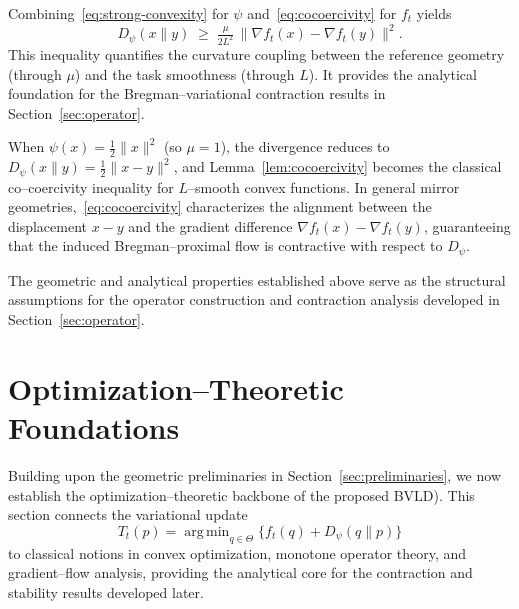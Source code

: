 \documentclass[11pt]{article}
\DeclareMathOperator*{\argmin}{arg\,min}
\theoremstyle{plain}
\theoremstyle{definition}
\theoremstyle{remark}
\begin{document}
Combining~\eqref{eq:strong-convexity} for $\psi$ and~\eqref{eq:cocoercivity} for $f_t$ yields
\begin{equation}
D_\psi(x\|y)
\;\ge\;
\tfrac{\mu}{2L^2}\,\|\nabla f_t(x)-\nabla f_t(y)\|^2.
\label{eq:compatibility}
\end{equation}
This inequality quantifies the curvature coupling between the reference geometry (through $\mu$)
and the task smoothness (through $L$).  It provides the analytical foundation for 
the Bregman–variational contraction results in Section~\ref{sec:operator}.


When $\psi(x)=\tfrac{1}{2}\|x\|^2$ (so $\mu=1$), the divergence reduces to 
$D_\psi(x\|y)=\tfrac{1}{2}\|x-y\|^2$, and Lemma~\ref{lem:cocoercivity} becomes 
the classical co–coercivity inequality for $L$–smooth convex functions.
In general mirror geometries,~\eqref{eq:cocoercivity} characterizes the 
alignment between the displacement $x-y$ and the gradient difference 
$\nabla f_t(x)-\nabla f_t(y)$, guaranteeing that the induced 
Bregman–proximal flow is contractive with respect to $D_\psi$.

\medskip
\noindent
The geometric and analytical properties established above serve as the 
structural assumptions for the operator construction and 
contraction analysis developed in Section~\ref{sec:operator}.






\section{Optimization–Theoretic Foundations}
\label{sec:optfoundations}

Building upon the geometric preliminaries in Section~\ref{sec:preliminaries}, 
we now establish the optimization–theoretic backbone of the proposed 
BVLD).  
This section connects the variational update
\[
T_t(p)=\argmin_{q\in\Theta}\{f_t(q)+D_\psi(q\|p)\}
\]
to classical notions in convex optimization, monotone operator theory, and 
gradient–flow analysis, providing the analytical core for the contraction 
and stability results developed later.
\end{document}
